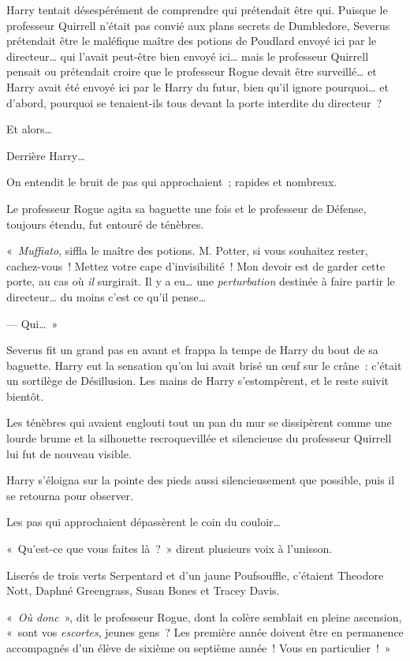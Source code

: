 Harry tentait désespérément de comprendre qui prétendait être qui.
Puisque le professeur Quirrell n'était pas convié aux plans secrets de Dumbledore, Severus prétendait être le maléfique maître des potions de Poudlard envoyé ici par le directeur… qui l'avait peut-être bien envoyé ici… mais le professeur Quirrell pensait ou prétendait croire que le professeur Rogue devait être surveillé… et Harry avait été envoyé ici par le Harry du futur, bien qu'il ignore pourquoi… et d'abord, pourquoi se tenaient-ils tous devant la porte interdite du directeur~?

Et alors…

Derrière Harry…

On entendit le bruit de pas qui approchaient~; rapides et nombreux.

Le professeur Rogue agita sa baguette une fois et le professeur de Défense, toujours étendu, fut entouré de ténèbres.

«~\emph{Muffiato}, siffla le maître des potions.
M. Potter, si vous souhaitez rester, cachez-vous~!
Mettez votre cape d'invisibilité~!
Mon devoir est de garder cette porte, au cas où \emph{il} surgirait.
Il y a eu… une \emph{perturbation} destinée à faire partir le directeur… du moins c'est ce qu'il pense…

--- Qui…~»

Severus fit un grand pas en avant et frappa la tempe de Harry du bout de sa baguette.
Harry eut la sensation qu'on lui avait brisé un œuf sur le crâne~: c'était un sortilège de Désillusion.
Les mains de Harry s'estompèrent, et le reste suivit bientôt.

Les ténèbres qui avaient englouti tout un pan du mur se dissipèrent comme une lourde brume et la silhouette recroquevillée et silencieuse du professeur Quirrell lui fut de nouveau visible.

Harry s'éloigna sur la pointe des pieds aussi silencieusement que possible, puis il se retourna pour observer.

Les pas qui approchaient dépassèrent le coin du couloir…

«~Qu'est-ce que vous faites là~?~»
dirent plusieurs voix à l'unisson.

Liserés de trois verts Serpentard et d'un jaune Poufsouffle, c'étaient Theodore Nott, Daphné Greengrass, Susan Bones et Tracey Davis.

«~\emph{Où donc}~», dit le professeur Rogue, dont la colère semblait en pleine ascension, «~sont vos \emph{escortes}, jeunes gens~?
Les première année doivent être en permanence accompagnés d'un élève de sixième ou septième année~!
Vous en particulier~!~»

